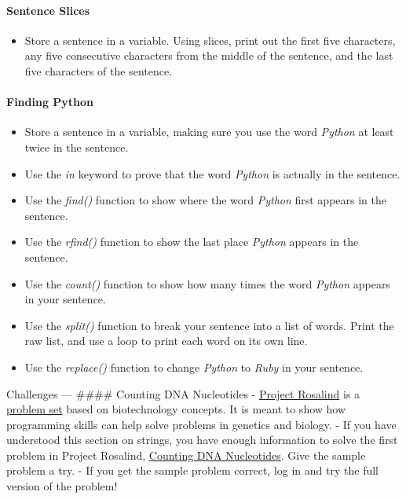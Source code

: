 \documentclass[11pt]{article}
\providecommand{\tightlist}{%
      \setlength{\itemsep}{0pt}\setlength{\parskip}{0pt}}
\begin{document}
\hypertarget{sentence-slices}{%
\paragraph{Sentence Slices}\label{sentence-slices}}

\begin{itemize}
\tightlist
\item
  Store a sentence in a variable. Using slices, print out the first five
  characters, any five consecutive characters from the middle of the
  sentence, and the last five characters of the sentence.
\end{itemize}

\hypertarget{finding-python}{%
\paragraph{Finding Python}\label{finding-python}}

\begin{itemize}
\tightlist
\item
  Store a sentence in a variable, making sure you use the word
  \emph{Python} at least twice in the sentence.
\item
  Use the \emph{in} keyword to prove that the word \emph{Python} is
  actually in the sentence.
\item
  Use the \emph{find()} function to show where the word \emph{Python}
  first appears in the sentence.
\item
  Use the \emph{rfind()} function to show the last place \emph{Python}
  appears in the sentence.
\item
  Use the \emph{count()} function to show how many times the word
  \emph{Python} appears in your sentence.
\item
  Use the \emph{split()} function to break your sentence into a list of
  words. Print the raw list, and use a loop to print each word on its
  own line.
\item
  Use the \emph{replace()} function to change \emph{Python} to
  \emph{Ruby} in your sentence.
\end{itemize}

    Challenges --- \#\#\#\# Counting DNA Nucleotides -
\href{http://rosalind.info/problems/locations/}{Project Rosalind} is a
\href{http://rosalind.info/problems/list-view/}{problem set} based on
biotechnology concepts. It is meant to show how programming skills can
help solve problems in genetics and biology. - If you have understood
this section on strings, you have enough information to solve the first
problem in Project Rosalind,
\href{http://rosalind.info/problems/dna/}{Counting DNA Nucleotides}.
Give the sample problem a try. - If you get the sample problem correct,
log in and try the full version of the problem!
\end{document}
